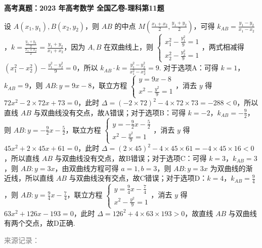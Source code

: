 \documentclass[UTF8,a4paper,11pt]{ctexart}
\newenvironment{gaokao}[1]{\par\medskip\noindent\textbf{高考真题：#1}\par\smallskip}{\par\medskip}
\begin{document}
\begin{gaokao}{2023 年高考数学 全国乙卷-理科第11题}
设 $A(x_1,y_1),B(x_2,y_2)$，则 $AB$ 的中点 $M(\frac{x_1+x_2}{2},\frac{y_1+y_2}{2})$，可得 $k_{AB}=\frac{y_1-y_2}{x_1-x_2}$，$k=\frac{\frac{y_1+y_2}{2}}{\frac{x_1+x_2}{2}}=\frac{y_1+y_2}{x_1+x_2}$，因为 $A,B$ 在双曲线上，则 $\begin{cases} x_1^2-\frac{y_1^2}{9}=1 \\ x_2^2-\frac{y_2^2}{9}=1 \end{cases}$，两式相减得 $(x_1^2-x_2^2)-\frac{y_1^2-y_2^2}{9}=0$，所以 $k_{AB}\cdot k=\frac{y_1^2-y_2^2}{x_1^2-x_2^2}=9$. 对于选项A：可得 $k=1$，$k_{AB}=9$，则 $AB:y=9x-8$，联立方程 $\begin{cases} y=9x-8 \\ x^2-\frac{y^2}{9}=1 \end{cases}$，消去 $y$ 得 $72x^2-2\times72x+73=0$，此时 $\Delta=(-2\times72)^2-4\times72\times73=-288<0$，所以直线 $AB$ 与双曲线没有交点，故A错误；对于选项B：可得 $k=-2$，$k_{AB}=-\frac{9}{2}$，则 $AB:y=-\frac{9}{2}x-\frac{5}{2}$，联立方程 $\begin{cases} y=-\frac{9}{2}x-\frac{5}{2} \\ x^2-\frac{y^2}{9}=1 \end{cases}$，消去 $y$ 得 $45x^2+2\times45x+61=0$，此时 $\Delta=(2\times45)^2-4\times45\times61=-4\times45\times16<0$，所以直线 $AB$ 与双曲线没有交点，故B错误；对于选项C：可得 $k=3$，$k_{AB}=3$，则 $AB:y=3x$，由双曲线方程可得 $a=1,b=3$，则 $AB:y=3x$ 为双曲线的渐近线，所以直线 $AB$ 与双曲线没有交点，故C错误；对于选项D：$k=4$，$k_{AB}=\frac{9}{4}$，则 $AB:y=\frac{9}{4}x-\frac{7}{4}$，联立方程 $\begin{cases} y=\frac{9}{4}x-\frac{7}{4} \\ x^2-\frac{y^2}{9}=1 \end{cases}$，消去 $y$ 得 $63x^2+126x-193=0$，此时 $\Delta=126^2+4\times63\times193>0$，故直线 $AB$ 与双曲线有两个交点，故D正确.

\par\smallskip\textcolor{gray}{\footnotesize 来源记录：\texttt{}}

\end{gaokao}
\end{document}
